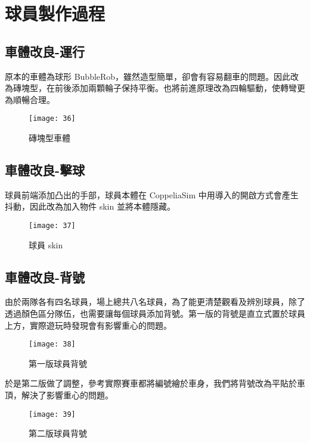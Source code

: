 \chapter{球員製作過程}
\renewcommand{\baselinestretch}{10.0} %
\setcounter{page}{2}  %
\fontsize{14pt}{2.5pt}\sectionef
\section{車體改良-運行}
  原本的車體為球形 BubbleRob，雖然造型簡單，卻會有容易翻車的問題。因此改為磚塊型，在前後添加兩顆輪子保持平衡。也將前進原理改為四輪驅動，使轉彎更為順暢合理。\\[1pt]
\begin{figure}[hbt!]
\begin{center}
\texttt{[image: 36]}
\caption{\Large 磚塊型車體}\label{fig.36}
\end{center}
\end{figure} 
\section{車體改良-擊球}
  球員前端添加凸出的手部，球員本體在 CoppeliaSim 中用導入的開啟方式會產生抖動，因此改為加入物件 skin 並將本體隱藏。\\
\begin{figure}[hbt!]
\begin{center}
\texttt{[image: 37]}
\caption{\Large 球員 skin}\label{fig.37}
\end{center}
\end{figure} 
\newpage
\section{車體改良-背號}
  由於兩隊各有四名球員，場上總共八名球員，為了能更清楚觀看及辨別球員，除了透過顏色區分隊伍，也需要讓每個球員添加背號。第一版的背號是直立式置於球員上方，實際遊玩時發現會有影響重心的問題。\\
\begin{figure}[hbt!]
\begin{center}
\texttt{[image: 38]}
\caption{\Large 第一版球員背號}\label{fig.38}
\end{center}
\end{figure}


於是第二版做了調整，參考實際賽車都將編號繪於車身，我們將背號改為平貼於車頂，解決了影響重心的問題。\\
\begin{figure}[hbt!]
\begin{center}
\texttt{[image: 39]}
\caption{\Large 第二版球員背號}\label{fig.39}
\end{center}
\end{figure}

\renewcommand{\baselinestretch}{1} %